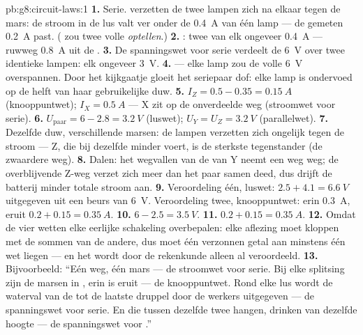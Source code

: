 \begin{solution}{pb:g8:circuit-laws:1}
\textbf{1.} Serie.  verzetten de twee lampen zich na
elkaar tegen de mars: de stroom in de lus valt ver onder de
\qty{0.4}{A} van één lamp --- de gemeten \qty{0.2}{A} past. (
zou twee volle  \emph{optellen}.)
\textbf{2.} : twee  van elk ongeveer
\qty{0.4}{A} --- ruwweg \qty{0.8}{A} uit de .
\textbf{3.} De spanningswet voor serie verdeelt de \qty{6}{V} over twee
identieke lampen: elk ongeveer \qty{3}{V}.
\textbf{4.}  --- elke lamp zou de volle \qty{6}{V}
overspannen. Door het kijkgaatje gloeit het seriepaar dof: elke lamp is
ondervoed op de helft van haar gebruikelijke duw.
\textbf{5.} $I_Z = 0.5 - 0.35 = \qty{0.15}{A}$
(knooppuntwet); $I_X = \qty{0.5}{A}$ --- X zit op de
onverdeelde weg (stroomwet voor serie).
\textbf{6.} $U_{\text{paar}} = 6 - 2.8 = \qty{3.2}{V}$ (luswet);
$U_Y = U_Z = \qty{3.2}{V}$ (parallelwet).
\textbf{7.} Dezelfde duw, verschillende marsen: de lampen verzetten
zich ongelijk tegen de stroom --- Z, die bij dezelfde
 minder voert, is de sterkste tegenstander (de
zwaardere weg).
\textbf{8.} Dalen: het wegvallen van de  van Y neemt een weg
weg; de overblijvende Z-weg verzet zich meer dan het paar samen deed,
dus drijft de batterij minder totale stroom aan.
\textbf{9.} Veroordeling één, luswet: $2.5 + 4.1 = \qty{6.6}{V}$
uitgegeven uit een beurs van \qty{6}{V}. Veroordeling twee,
knooppuntwet: erin \qty{0.3}{A}, eruit $0.2 + 0.15 =
\qty{0.35}{A}$.
\textbf{10.} $6 - 2.5 = \qty{3.5}{V}$.
\textbf{11.} $0.2 + 0.15 = \qty{0.35}{A}$.
\textbf{12.} Omdat de vier wetten elke eerlijke schakeling
overbepalen: elke aflezing moet kloppen met de sommen van de andere,
dus moet één verzonnen getal aan minstens één wet liegen --- en het
wordt door de rekenkunde alleen al veroordeeld.
\textbf{13.} Bijvoorbeeld: ``Eén weg, één mars --- de stroomwet voor
serie. Bij elke splitsing zijn de marsen in , erin is eruit
--- de knooppuntwet. Rond elke lus wordt de waterval van de
 tot de laatste druppel door de werkers uitgegeven ---
de spanningswet voor serie. En  die tussen dezelfde twee
 hangen, drinken van dezelfde hoogte --- de
spanningswet voor .''
\end{solution}
